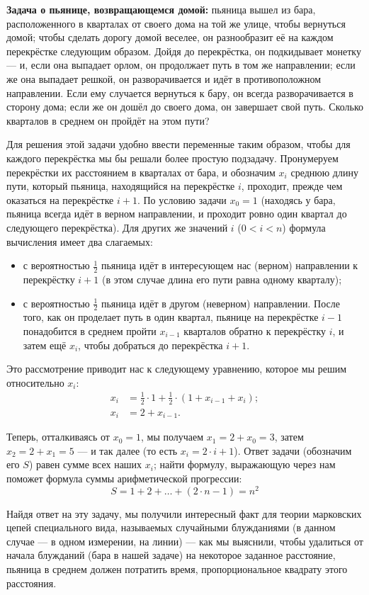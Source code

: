 \documentclass{article}
\begin{document}
\noindent\textbf{Задача о пьянице, возвращающемся домой:} 
пьяница вышел из бара, расположенного в  кварталах от своего дома на той же улице, чтобы вернуться домой; чтобы сделать дорогу домой веселее, он разнообразит её на каждом перекрёстке следующим образом. 
Дойдя до перекрёстка, он подкидывает монетку --- и, если она выпадает орлом, он продолжает путь в том же направлении; если же она выпадает решкой, он разворачивается и идёт в противоположном направлении. Если ему случается вернуться к бару, он всегда разворачивается в сторону дома; если же он дошёл до своего дома, он завершает свой путь. Сколько кварталов в среднем он пройдёт на этом пути?

Для решения этой задачи удобно ввести переменные таким образом, чтобы для каждого перекрёстка мы бы решали более простую подзадачу. 
Пронумеруем перекрёстки их расстоянием в кварталах от бара, и обозначим $x_i$  среднюю длину пути, который пьяница, находящийся на перекрёстке $i$, проходит, прежде чем оказаться на перекрёстке $i+1$. 
По условию задачи $x_0=1$ 
(находясь у бара, пьяница всегда идёт в верном направлении, и проходит ровно один квартал до следующего перекрёстка).
Для других же значений $i$ ($0<i<n$) 
формула вычисления  имеет два слагаемых:
\begin{itemize}
\item с вероятностью $\tfrac12$ пьяница идёт в интересующем нас (верном) направлении к перекрёстку $i+1$ 
(в этом случае длина его пути равна одному кварталу);
\item с вероятностью $\tfrac12$ пьяница идёт в другом (неверном) направлении. После того, как он проделает путь в один квартал, пьянице на перекрёстке $i-1$ понадобится в среднем пройти $x_{i-1}$ кварталов обратно к перекрёстку $i$, и затем ещё $x_i$, 
чтобы добраться до перекрёстка $i+1$.
\end{itemize}
Это рассмотрение приводит нас к следующему уравнению, которое мы решим относительно $x_i$:
\begin{align*}
x_i&=\tfrac12\cdot 1+\tfrac12\cdot(1+x_{i-1}+x_i);
\\
x_i&=2+x_{i-1}.
\end{align*}

Теперь, отталкиваясь от $x_0=1$, 
мы получаем $x_1=2+x_0=3$, 
затем $x_2=2+x_1=5$  --- и так далее (то есть $x_i=2\cdot i+1$). 
Ответ задачи (обозначим его $S$) 
равен сумме всех наших $x_i$; найти формулу, выражающую  через  нам поможет формула суммы арифметической прогрессии:
\[S=1+2+\dots+(2\cdot n-1)=n^2\]

Найдя ответ на эту задачу, мы получили интересный факт для теории марковских цепей специального вида, называемых случайными блужданиями (в данном случае --- в одном измерении, на линии) --- как мы выяснили, чтобы удалиться от начала блужданий (бара в нашей задаче) на некоторое заданное расстояние, пьяница в среднем должен потратить время, пропорциональное квадрату этого расстояния. 
\end{document}
